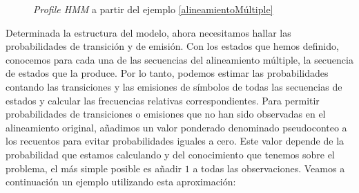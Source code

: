 \begin{figure}[H]
\caption{\textit{Profile HMM} a partir del ejemplo \ref{alineamientoMúltiple}}
\label{profileHMMFinal}
\end{figure}

Determinada la estructura del modelo, ahora necesitamos hallar las probabilidades de transición y de emisión. Con los estados que hemos definido, conocemos para cada una de las secuencias del alineamiento múltiple, la secuencia de estados que la produce. Por lo tanto, podemos estimar las probabilidades contando las transiciones y las emisiones de símbolos de todas las secuencias de estados y calcular las frecuencias relativas correspondientes. Para permitir probabilidades de transiciones o emisiones que no han sido observadas en el alineamiento original, añadimos un valor ponderado denominado pseudoconteo a los recuentos para evitar probabilidades iguales a cero. Este valor depende de la probabilidad que estamos calculando y del conocimiento que tenemos sobre el problema, el más simple posible es añadir $1$ a todas las observaciones. Veamos a continuación un ejemplo utilizando esta aproximación:


